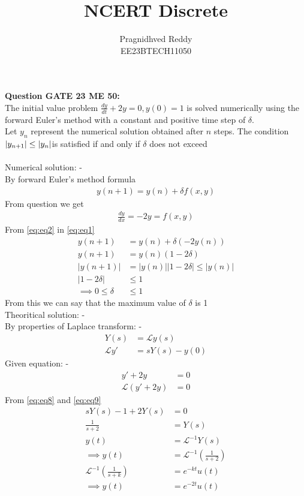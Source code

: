 \documentclass[journal,12pt,twocolumn]{IEEEtran}
\title{NCERT Discrete}
\author{Pragnidhved Reddy\\EE23BTECH11050}
\date{}
\begin{document}
\maketitle
\newpage
\bigskip
\textbf{Question GATE 23 ME 50:}\\
The initial value problem
$\frac{dy}{dt}+2y=0, y(0)=1 $
is solved numerically using the forward Euler's method with a constant and positive time step of $\delta $.\\
Let $y_n$ represent the numerical solution obtained after $n$ steps. The condition $\left\vert y_{n+1}\right\vert \leq \left\vert y_n\right\vert$is satisfied if and only if $\delta$ does not exceed\\
\solution \\
Numerical solution: -\\
By forward Euler's method formula 
\begin{align}
\label{eq:eq1}
    y(n+1)=y(n)+\delta  f(x,y)
\end{align}
From question we get
\begin{align}
\label{eq:eq2}
    \frac{dy}{dx}=-2y=f(x,y)
\end{align}
From \eqref{eq:eq2} in \eqref{eq:eq1}
\begin{align}
    y(n+1)&=y(n)+\delta(-2y(n))\\
    y(n+1)&=y(n)(1-2\delta )\\
    |y(n+1)|&=|y(n)||1-2\delta | \leq|y(n)|  \\
    |1-2\delta | &\leq 1\\
    \implies 0 \leq \delta  &\leq 1
\end{align}
From this we can say that the maximum value of $\delta  $ is 1\\
Theoritical solution: -\\
By properties of Laplace transform: -
\begin{align}
\label{eq:eq8}
Y(s)&=\mathcal{L}y(s)\\
\label{eq:eq9}
\mathcal{L}y'&=sY(s)-y(0)
\end{align}
Given equation: -
\begin{align}
y'+2y&=0\\
\mathcal{L}(y'+2y)&=0
\end{align}
From \eqref{eq:eq8} and \eqref{eq:eq9}
\begin{align}
sY(s)-1+2Y(s)&=0\\
\frac{1}{s+2}&=Y(s)\\
y(t)&=\mathcal{L}^{-1}Y(s)\\
\implies y(t)&=\mathcal{L}^{-1}\left(\frac{1}{s+2}\right)\\
\mathcal{L}^{-1}\left(\frac{1}{s+k}\right)&=e^{-kt}u(t)\\
\implies y(t)&=e^{-2t}u(t) 
\end{align}
\end{document}
